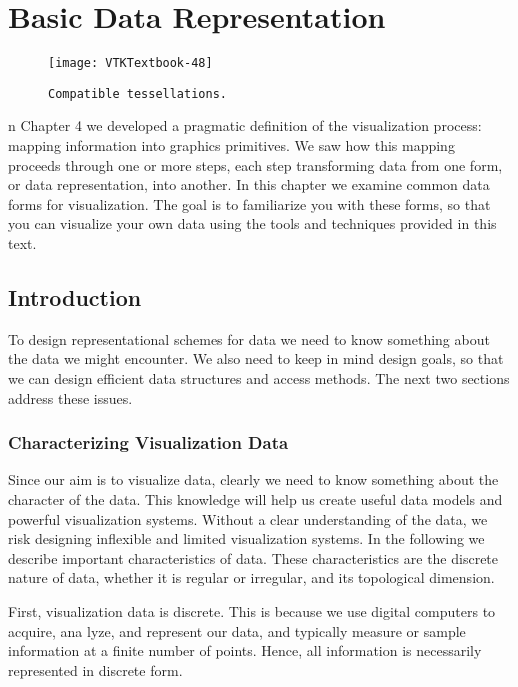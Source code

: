 \chapter{Basic Data Representation}
\label{chap:basic_data_representation}

\begin{figure}[ht]
	\hfill
	\begin{minipage}{0.5\textwidth}
		\centering
		\texttt{[image: VTKTextbook-48]}\\
		\caption*{\texttt{Compatible tessellations.}}
	\end{minipage}
\end{figure}

n Chapter 4 we developed a pragmatic definition of the visualization process: mapping information into graphics primitives.
We saw how this mapping proceeds through one or more steps, each step transforming data from one form, or data representation, into another.
In this chapter we examine common data forms for visualization.
The goal is to familiarize you with these forms, so that you can visualize your own data using the tools and techniques provided in this text.

\section{Introduction}
To design representational schemes for data we need to know something about the data we might
encounter. We also need to keep in mind design goals, so that we can design efficient data structures
and access methods. The next two sections address these issues.

\subsection{Characterizing Visualization Data}

Since our aim is to visualize data, clearly we need to know something about the character of the data. This knowledge will help us create useful data models and powerful visualization systems. Without a clear understanding of the data, we risk designing inflexible and limited visualization systems. In the following we describe important characteristics of data. These characteristics are the discrete nature of data, whether it is regular or irregular, and its topological dimension.

First, visualization data is discrete. This is because we use digital computers to acquire, ana lyze, and represent our data, and typically measure or sample information at a finite number of points. Hence, all information is necessarily represented in discrete form. 

